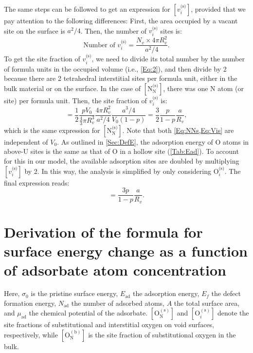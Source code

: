 \documentclass[preprint,12pt,sort&compress]{elsarticle}
\newcommand{\?}{\stackrel{?}{=}}
\begin{document}
The same steps can be followed to get an expression for $[v_i^\text{(s)}]$, provided that we pay attention to the following differences: First, the area occupied by a vacant site on the surface is $a^2/4$. Then, the number of $v_i^\text{(s)}$ sites is:
\begin{equation}
\text{Number of } v_i^\text{(s)} = \frac{ N_v \times 4 \pi R_v^2 } { a^2 / 4 }.
\end{equation}
To get the site fraction of $v_i^\text{(s)}$, we need to divide its total number by the number of formula units in the occupied volume (i.e., \cref{Eq:2}), and then divide by 2 because there are 2 tetrahedral interstitial sites per formula unit, either in the bulk material or on the surface. In the case of $[ \text{N}_\text{N}^\text{(s)} ]$, there was one N atom (or site) per formula unit. Then, the site fraction of $v_i^\text{(s)}$ is: 
\begin{equation}
[ v_i^\text{(s)} ] = \frac{1}{2} \frac{p V_0}{ \frac{4}{3} \pi R_v^3 } \frac{4 \pi R_v^2}{ a^2/4}  \frac{ a^3/4 }{ V_0 (1 - p) } = \frac{3}{2} \frac{p}{1-p} \frac{a}{R_v},
\label{Eq:Vis}
\end{equation}
which is the same expression for $[ \text{N}_\text{N}^\text{(s)} ]$. Note that both \cref{Eq:NNs,Eq:Vis} are independent of $V_0$. As outlined in \cref{Sec:DefE}, the adsorption energy of O atoms in above-U sites is the same as that of O in a hollow site (\cref{Tab:Ead}). To account for this in our model, the available adsorption sites are doubled by multiplying $[ v_i^\text{(s)} ]$ by 2. In this way, the analysis is simplified by only considering $\text{O}_i^{\text{(s)}}$. The final expression reads:
\begin{equation}
[v_i^{\text{(s)}}] = \frac{3p}{1-p} \frac{a}{R_v}.
\end{equation}

\section{Derivation of the formula for surface energy change as a function of adsorbate atom concentration}
\label{App2}

Here, $\sigma_0$ is the pristine surface energy, $E_\text{ad}$ the adsorption energy, $E_f$ the defect formation energy, $N_\text{ad}$ the number of adsorbed atoms, $A$ the total surface area, and $\mu_\text{ad}$ the chemical potential of the adsorbate. $[\text{O}_\text{N}^{(\text{s})}]$ and $[\text{O}_i^{(\text{s})}]$ denote the site fractions of substitutional and interstitial oxygen on void surfaces, respectively, while $[\text{O}_\text{N}^{(\text{b})}]$ is the site fraction of substitutional oxygen in the bulk.
\end{document}
